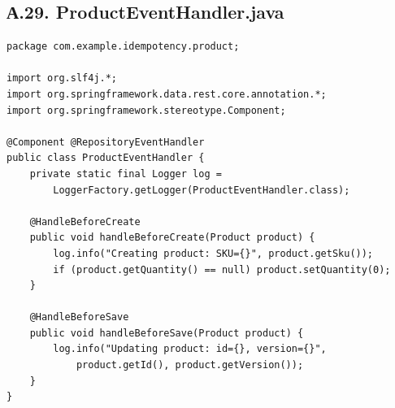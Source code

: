 \subsection*{А.29. ProductEventHandler.java}
\begin{lstlisting}[caption={ProductEventHandler.java --- обработчик событий Spring Data REST}]
package com.example.idempotency.product;

import org.slf4j.*;
import org.springframework.data.rest.core.annotation.*;
import org.springframework.stereotype.Component;

@Component @RepositoryEventHandler
public class ProductEventHandler {
    private static final Logger log =
        LoggerFactory.getLogger(ProductEventHandler.class);

    @HandleBeforeCreate
    public void handleBeforeCreate(Product product) {
        log.info("Creating product: SKU={}", product.getSku());
        if (product.getQuantity() == null) product.setQuantity(0);
    }

    @HandleBeforeSave
    public void handleBeforeSave(Product product) {
        log.info("Updating product: id={}, version={}",
            product.getId(), product.getVersion());
    }
}
\end{lstlisting}


